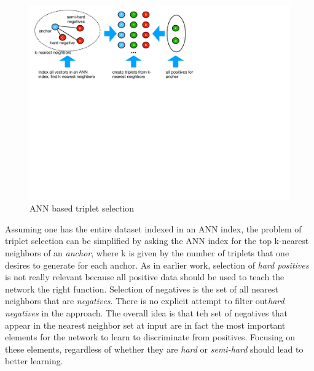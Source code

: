 \begin{figure}
\includegraphics[width=1.0\linewidth]{ANN_selection}
\caption{ANN based triplet selection}
\label{ANN_selection}
\end{figure}

Assuming one has the entire dataset indexed in an ANN index, the problem of triplet selection can be simplified by asking the ANN index for the top k-nearest neighbors of an \textit{anchor}, where k is given by the number of triplets that one desires to generate for each anchor.  As in earlier work, selection of \textit{hard positives} is not really relevant because all positive data should be used to teach the network the right function.  Selection of negatives is the set of all nearest neighbors that are \textit{negatives}.  There is no explicit attempt to filter out\textit{hard negatives} in the approach.  The overall idea is that teh set of negatives that appear in the nearest neighbor set at input are in fact the most important elements for the network to learn to discriminate from positives.  Focusing on these elements, regardless of whether they are \textit{hard} or \textit{semi-hard} should lead to better learning.

